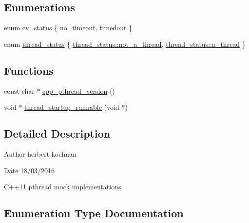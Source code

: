 \subsection*{Enumerations}
\begin{DoxyCompactItemize}
\item 
enum \hyperlink{namespacepthread_a823f88a2bf448bd5bd5273b826830bdd}{cv\+\_\+status} \{ \hyperlink{namespacepthread_a823f88a2bf448bd5bd5273b826830bdda633b1bc5140f77a22f2c26bea4fa3398}{no\+\_\+timeout}, 
\hyperlink{namespacepthread_a823f88a2bf448bd5bd5273b826830bdda1c2d3e88a4ad820053c817753867b31a}{timedout}
 \}
\item 
enum \hyperlink{namespacepthread_ac4b6e78f3d72c946ace7a92f3bec4101}{thread\+\_\+status} \{ \hyperlink{namespacepthread_ac4b6e78f3d72c946ace7a92f3bec4101a8414cd8c988083af4eabb1311df873cf}{thread\+\_\+status\+::not\+\_\+a\+\_\+thread}, 
\hyperlink{namespacepthread_ac4b6e78f3d72c946ace7a92f3bec4101a13b3689524b86ca2caaee82399099df1}{thread\+\_\+status\+::a\+\_\+thread}
 \}
\end{DoxyCompactItemize}
\subsection*{Functions}
\begin{DoxyCompactItemize}
\item 
const char $\ast$ \hyperlink{namespacepthread_ad04d8bbcf57d64ba29047b53432a9ceb}{cpp\+\_\+pthread\+\_\+version} ()
\item 
void $\ast$ \hyperlink{namespacepthread_a4ca2138b7b0d82d63a05c708edd45a6f}{thread\+\_\+startup\+\_\+runnable} (void $\ast$)
\end{DoxyCompactItemize}


\subsection{Detailed Description}
\begin{DoxyAuthor}{Author}
herbert koelman 
\end{DoxyAuthor}
\begin{DoxyDate}{Date}
18/03/2016
\end{DoxyDate}
C++11 pthread mock implementations 

\subsection{Enumeration Type Documentation}
